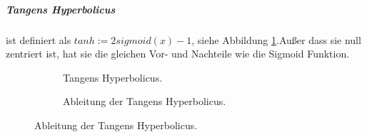 \documentclass[12pt,a4paper]{scrartcl}
\numberwithin{equation}{section}
\begin{document}
\subparagraph{Tangens Hyperbolicus} ist definiert als	$ tanh := 2sigmoid(x) -1$, siehe Abbildung \ref{fig:tanh}.Außer dass sie null zentriert ist, hat sie die gleichen Vor- und Nachteile wie die Sigmoid Funktion.
\begin{figure}[h!]
	\caption{Tangens Hyperbolicus.}
	\begin{subfigure}{.5\textwidth}	
		\centering	
		\caption{Tangens Hyperbolicus.}
	\end{subfigure}%
	\begin{subfigure}{.5\textwidth}		
		\centering
		\caption{Ableitung der Tangens Hyperbolicus.}
	\end{subfigure}
	\label{fig:tanh}		
\end{figure}
\end{document}
